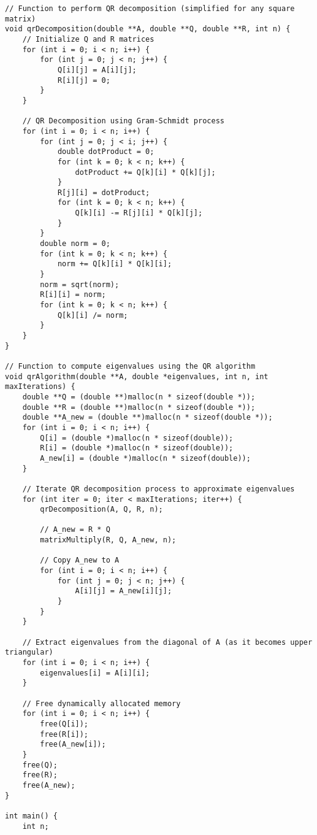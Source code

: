 \documentclass[journal]{IEEEtran}
\begin{document}
\begin{enumerate}
\begin{lstlisting}
// Function to perform QR decomposition (simplified for any square matrix)
void qrDecomposition(double **A, double **Q, double **R, int n) {
    // Initialize Q and R matrices
    for (int i = 0; i < n; i++) {
        for (int j = 0; j < n; j++) {
            Q[i][j] = A[i][j];
            R[i][j] = 0;
        }
    }

    // QR Decomposition using Gram-Schmidt process
    for (int i = 0; i < n; i++) {
        for (int j = 0; j < i; j++) {
            double dotProduct = 0;
            for (int k = 0; k < n; k++) {
                dotProduct += Q[k][i] * Q[k][j];
            }
            R[j][i] = dotProduct;
            for (int k = 0; k < n; k++) {
                Q[k][i] -= R[j][i] * Q[k][j];
            }
        }
        double norm = 0;
        for (int k = 0; k < n; k++) {
            norm += Q[k][i] * Q[k][i];
        }
        norm = sqrt(norm);
        R[i][i] = norm;
        for (int k = 0; k < n; k++) {
            Q[k][i] /= norm;
        }
    }
}

// Function to compute eigenvalues using the QR algorithm
void qrAlgorithm(double **A, double *eigenvalues, int n, int maxIterations) {
    double **Q = (double **)malloc(n * sizeof(double *));
    double **R = (double **)malloc(n * sizeof(double *));
    double **A_new = (double **)malloc(n * sizeof(double *));
    for (int i = 0; i < n; i++) {
        Q[i] = (double *)malloc(n * sizeof(double));
        R[i] = (double *)malloc(n * sizeof(double));
        A_new[i] = (double *)malloc(n * sizeof(double));
    }

    // Iterate QR decomposition process to approximate eigenvalues
    for (int iter = 0; iter < maxIterations; iter++) {
        qrDecomposition(A, Q, R, n);

        // A_new = R * Q
        matrixMultiply(R, Q, A_new, n);

        // Copy A_new to A
        for (int i = 0; i < n; i++) {
            for (int j = 0; j < n; j++) {
                A[i][j] = A_new[i][j];
            }
        }
    }

    // Extract eigenvalues from the diagonal of A (as it becomes upper triangular)
    for (int i = 0; i < n; i++) {
        eigenvalues[i] = A[i][i];
    }

    // Free dynamically allocated memory
    for (int i = 0; i < n; i++) {
        free(Q[i]);
        free(R[i]);
        free(A_new[i]);
    }
    free(Q);
    free(R);
    free(A_new);
}

int main() {
    int n;


\end{lstlisting}
\end{enumerate}
\end{document}

